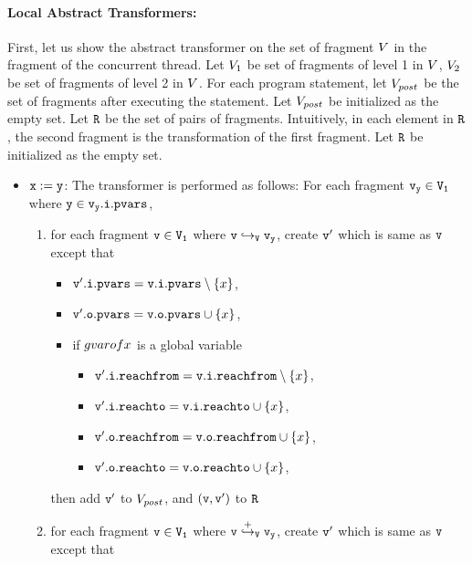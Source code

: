 \paragraph{Local Abstract Transformers:} First, let us show the abstract transformer on the set of fragment $V$ in the fragment of the concurrent thread. Let $V_1$ be set of fragments of level 1 in $V$, $V_2$ be set of fragments of level 2 in $V$. For each program statement, let $V_{post}$ be the set of fragments after executing the statement. Let $V_{post}$ be initialized as the empty set.  Let $\tt R$ be the set of pairs of fragments. Intuitively, in each element in $\tt R$, the second fragment is the transformation of the first fragment. Let $\tt R$ be initialized as the empty set.
\begin{itemize}
\item ${\tt x := y}$: The transformer is performed as follows:  For each fragment $\tt \mathtt{v}_y \in V_1$ where $\tt y \in\mathtt{v}_y.\mathtt{i}.\mathtt{pvars}$, 
\begin{enumerate}
\item  for each fragment $\tt v \in V_1$ where $\tt v \hookrightarrow_{V} \mathtt{v}_y$, create $\tt v'$ which is same as $\tt v$ except that
\begin{itemize}
\item $\mathtt{v}'.\mathtt{i}.\mathtt{pvars} = \mathtt{v}.\mathtt{i}.\mathtt{pvars} \setminus \left\{x\right\}$,
\item $\mathtt{v}'.\mathtt{o}.\mathtt{pvars} = \mathtt{v}.\mathtt{o}.\mathtt{pvars} \cup \left\{x\right\}$,
\item if $\\gvarof{x}$ is a global variable
\begin{itemize}
\item $\mathtt{v}'.\mathtt{i}.\mathtt{reachfrom} = \mathtt{v}.\mathtt{i}.\mathtt{reachfrom} \setminus \left\{x\right\}$,
\item $\mathtt{v}'.\mathtt{i}.\mathtt{reachto} = \mathtt{v}.\mathtt{i}.\mathtt{reachto} \cup \left\{x\right\}$,
 \item $\mathtt{v}'.\mathtt{o}.\mathtt{reachfrom} = \mathtt{v}.\mathtt{o}.\mathtt{reachfrom} \cup \left\{x\right\}$,
\item $\mathtt{v}'.\mathtt{o}.\mathtt{reachto} = \mathtt{v}.\mathtt{o}.\mathtt{reachto} \cup \left\{x\right\}$,
\end{itemize}
\end{itemize}
then add $\tt v'$ to $V_{post}$, and $\tt (v,v')$ to $\tt R$
\item for each fragment $\tt v \in V_1$ where $\tt v \overset{+}\hookrightarrow_{V} \mathtt{v}_y$, create $\tt v'$ which is same as $\tt v$ except that

\end{enumerate}
\end{itemize}

